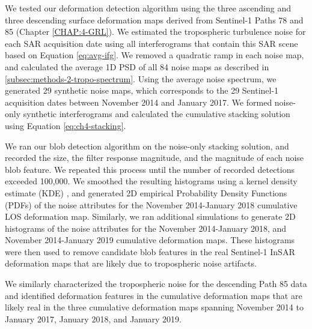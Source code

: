 We tested our deformation detection algorithm using the three ascending and three descending surface deformation maps derived from Sentinel-1 Paths 78 and 85 (Chapter \ref{CHAP:4-GRL}).
We estimated the tropospheric turbulence noise for each SAR acquisition date using all interferograms that contain this SAR scene based on Equation \eqref{eq:avg-ifg}. We removed a quadratic ramp in each noise map, and calculated the average 1D PSD of all 84 noise maps as described in \ref{subsec:methods-2-tropo-spectrum}.
Using the average noise spectrum, we generated 29 synthetic noise maps, which corresponds to the 29 Sentinel-1 acquisition dates between November 2014 and January 2017. We formed noise-only synthetic interferograms and calculated the cumulative stacking solution using Equation \eqref{eq:ch4-stacking}. 

We ran our blob detection algorithm on the noise-only stacking solution, and recorded the size, the filter response magnitude, and the magnitude of each noise blob feature. We repeated this process until the number of recorded detections exceeded 100,000. We smoothed the resulting histograms using a kernel density estimate (KDE) \cite{Scott2015MultivariateDensityEstimation}, and generated 2D empirical Probability Density Functions (PDFs) of the noise attributes for the November 2014-January 2018 cumulative LOS deformation map.
Similarly, we ran additional simulations to generate 2D histograms of the noise attributes for the November 2014-January 2018, and November 2014-January 2019 cumulative deformation maps.
These histograms were then used to remove candidate blob features in the real Sentinel-1 InSAR deformation maps that are likely due to tropospheric noise artifacts.

We similarly characterized the tropospheric noise for the descending Path 85 data and identified deformation features in the cumulative deformation maps that are likely real in the three cumulative deformation maps spanning November 2014 to January 2017, January 2018, and January 2019.



